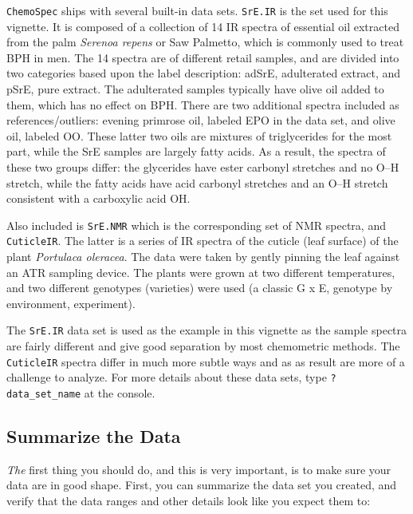 \documentclass[letter,10pt,twocolumn,twoside,printwatermark=false]{pinp}
\begin{document}
\texttt{ChemoSpec} ships with several built-in data sets.
\texttt{SrE.IR} is the set used for this vignette. It is composed of a
collection of 14 IR spectra of essential oil extracted from the palm
\emph{Serenoa repens} or Saw Palmetto, which is commonly used to treat
BPH in men. The 14 spectra are of different retail samples, and are
divided into two categories based upon the label description: adSrE,
adulterated extract, and pSrE, pure extract. The adulterated samples
typically have olive oil added to them, which has no effect on BPH.
There are two additional spectra included as references/outliers:
evening primrose oil, labeled EPO in the data set, and olive oil,
labeled OO. These latter two oils are mixtures of triglycerides for the
most part, while the SrE samples are largely fatty acids. As a result,
the spectra of these two groups differ: the glycerides have ester
carbonyl stretches and no O--H stretch, while the fatty acids have acid
carbonyl stretches and an O--H stretch consistent with a carboxylic acid
OH.

Also included is \texttt{SrE.NMR} which is the corresponding set of NMR
spectra, and \texttt{CuticleIR}. The latter is a series of IR spectra of
the cuticle (leaf surface) of the plant \emph{Portulaca oleracea}. The
data were taken by gently pinning the leaf against an ATR sampling
device. The plants were grown at two different temperatures, and two
different genotypes (varieties) were used (a classic G x E, genotype by
environment, experiment).

The \texttt{SrE.IR} data set is used as the example in this vignette as
the sample spectra are fairly different and give good separation by most
chemometric methods. The \texttt{CuticleIR} spectra differ in much more
subtle ways and as as result are more of a challenge to analyze. For
more details about these data sets, type \texttt{?data\_set\_name} at
the console.

\hypertarget{summarize-the-data}{%
\subsection{Summarize the Data}\label{summarize-the-data}}

\label{sec-prelim} \emph{The} first thing you should do, and this is
very important, is to make sure your data are in good shape. First, you
can summarize the data set you created, and verify that the data ranges
and other details look like you expect them to:

\begin{Shaded}
\begin{Highlighting}[]
\end{Highlighting}
\end{Shaded}
\end{document}

